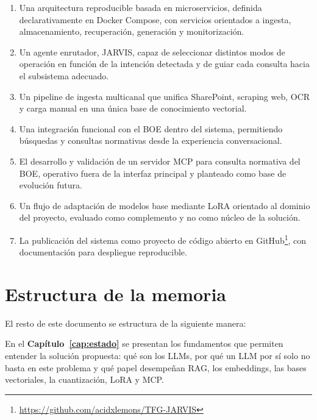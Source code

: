 \begin{enumerate}
    \item Una arquitectura reproducible basada en microservicios, definida declarativamente en Docker Compose, con servicios orientados a ingesta, almacenamiento, recuperación, generación y monitorización.

    \item Un agente enrutador, JARVIS, capaz de seleccionar distintos modos de operación en función de la intención detectada y de guiar cada consulta hacia el subsistema adecuado.

    \item Un pipeline de ingesta multicanal que unifica SharePoint, scraping web, OCR y carga manual en una única base de conocimiento vectorial.

    \item Una integración funcional con el BOE dentro del sistema, permitiendo búsquedas y consultas normativas desde la experiencia conversacional.

    \item El desarrollo y validación de un servidor MCP para consulta normativa del BOE, operativo fuera de la interfaz principal y planteado como base de evolución futura.

    \item Un flujo de adaptación de modelos base mediante LoRA orientado al dominio del proyecto, evaluado como complemento y no como núcleo de la solución.

    \item La publicación del sistema como proyecto de código abierto en GitHub\footnote{\url{https://github.com/acidxlemons/TFG-JARVIS}}, con documentación para despliegue reproducible.
\end{enumerate}

\section{Estructura de la memoria}

El resto de este documento se estructura de la siguiente manera:

En el \textbf{Capítulo~\ref{cap:estado}} se presentan los fundamentos que permiten entender la solución propuesta: qué son los LLMs, por qué un LLM por sí solo no basta en este problema y qué papel desempeñan RAG, los embeddings, las bases vectoriales, la cuantización, LoRA y MCP.

